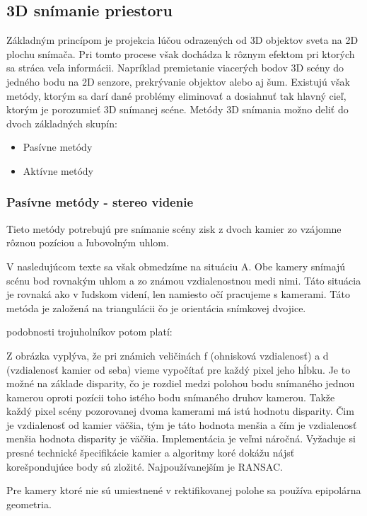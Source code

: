 \subsection{3D snímanie priestoru}
Základným princípom je projekcia lúčou odrazených od 3D objektov sveta na 2D plochu snímača. Pri tomto procese však dochádza k rôznym efektom pri ktorých sa stráca veľa informácii. Napríklad premietanie viacerých bodov 3D scény do jedného bodu na 2D senzore, prekrývanie objektov alebo aj šum. Existujú však metódy, ktorým sa darí dané problémy eliminovať a dosiahnuť tak  hlavný cieľ, ktorým je porozumieť 3D snímanej scéne. Metódy 3D snímania možno deliť do dvoch základných skupín: 

\begin{itemize}
\item Pasívne metódy
\item Aktívne metódy 
\end{itemize}

\subsubsection{Pasívne metódy - stereo videnie}
Tieto metódy potrebujú pre snímanie scény zisk z dvoch kamier zo vzájomne rôznou pozíciou a ľubovolným uhlom. 


V nasledujúcom texte sa však obmedzíme na situáciu A. Obe kamery snímajú scénu bod rovnakým uhlom a zo známou vzdialenostnou medi nimi. Táto situácia je rovnaká ako v ľudskom videní, len namiesto očí pracujeme s kamerami. Táto metóda je založená na triangulácii čo je orientácia snímkovej dvojice. 


podobnosti trojuholníkov potom platí:


 Z obrázka vyplýva, že pri známich veličinách f (ohnisková vzdialenosť) a d (vzdialenosť kamier od seba) vieme vypočítať pre každý pixel jeho hĺbku. Je to možné na základe disparity, čo je rozdiel medzi polohou bodu snímaného jednou kamerou oproti pozícii toho istého bodu snímaného druhov kamerou. Takže každý pixel scény pozorovanej dvoma kamerami má istú hodnotu disparity. Čim je vzdialenosť od kamier väčšia, tým je táto hodnota menšia a čím je vzdialenosť menšia hodnota disparity je väčšia. Implementácia je veľmi náročná. Vyžaduje si presné technické špecifikácie kamier a algoritmy  koré dokážu nájsť korešpondujúce body sú zložité. Najpoužívanejším je RANSAC. 

Pre kamery ktoré nie sú umiestnené v rektifikovanej  polohe sa používa epipolárna geometria. 


